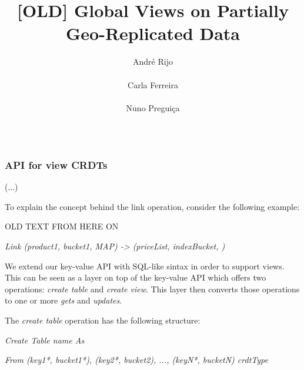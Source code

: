 \documentclass{vldb}
\newcommand{\grumbler}[2]{{\color{red}{\bf #1:} #2}}
\newcommand{\andre}[1]{\grumbler{andre}{#1}}
\newcommand{\emphvspace}{0.5\baselineskip}
\newcommand{\lineemph}[1]{\vspace{\emphvspace}\hspace{2em}\emph{#1}\vspace{\emphvspace}}
\newcommand{\firstblockemph}[1]{\vspace{\emphvspace}\hspace{2em}\emph{#1}}
\newcommand{\lastblockemph}[1]{\hspace{2em}\emph{#1}\vspace{\emphvspace}}
\begin{document}
\title{[OLD] Global Views on Partially Geo-Replicated Data}

\author{\alignauthor André Rijo\\
       \\
\alignauthor Carla Ferreira\\
       \\
\alignauthor
Nuno Preguiça\\
       \\
}

\maketitle

\subsubsection{API for view CRDTs}


(...)








To explain the concept behind the link operation, consider the following example:

\andre{OLD TEXT FROM HERE ON}

\lineemph{Link (product1, bucket1, MAP) -> (priceList, indexBucket, )}

We extend our key-value API with SQL-like sintax in order to support views.
This can be seen as a layer on top of the key-value API which offers two operations: \emph{create table} and \emph{create view}.
This layer then converts those operations to one or more \emph{gets} and \emph{updates}.

The \emph{create table} operation has the following structure:

\firstblockemph{Create Table name As}

\lastblockemph{From (key1*, bucket1*), (key2*, bucket2), ..., (keyN*, bucketN) crdtType}
\end{document}
